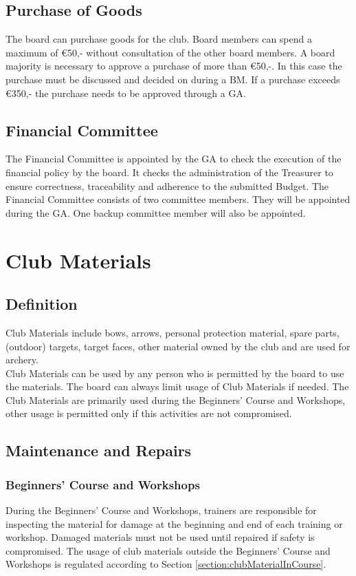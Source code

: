 \documentclass[a4paper]{article}
\begin{document}
\subsection{Purchase of Goods}
The board can purchase goods for the club. Board members can spend a maximum of €50,- without consultation of the other board members. A board majority is necessary to approve a purchase of more than €50,-. In this case the purchase must be discussed and decided on during a BM. If a purchase exceeds €350,- the purchase needs to be approved through a GA.

\subsection{Financial Committee}
The Financial Committee is appointed by the GA to check the execution of the financial policy by the board. It checks the administration of the Treasurer to ensure correctness, traceability and adherence to the submitted Budget. The Financial Committee consists of two committee members. They will be appointed during the GA. One backup committee member will also be appointed.

\section{Club Materials}
\subsection{Definition}
Club Materials include bows, arrows, personal protection material, spare parts, (outdoor) targets, target faces, other material owned by the club and are used for archery. \\

Club Materials can be used by any person who is permitted by the board to use the materials. The board can always limit usage of Club Materials if needed. The Club Materials are primarily used during the Beginners' Course and Workshops, other usage is permitted only if this activities are not compromised.

\subsection{Maintenance and Repairs}
\subsubsection{Beginners' Course and Workshops}
During the Beginners' Course and Workshops, trainers are responsible for inspecting the material for damage at the beginning and end of each training or workshop. Damaged materials must not be used until repaired if safety is compromised. The usage of club materials outside the Beginners' Course and Workshops is regulated according to Section \ref{section:clubMaterialInCourse}.
\end{document}
